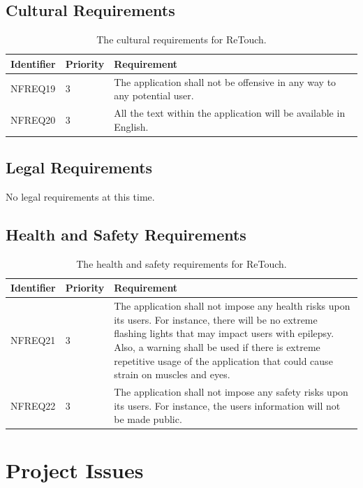 \documentclass[12pt, titlepage]{article}
\begin{document}
\subsection{Cultural Requirements}

\begin{table}[H]
  \caption{The cultural requirements for ReTouch.}
\begin{tabular}{ |m{2cm}|m{1.8cm}|m{9.4cm}| }
    \hline
    \textbf{Identifier} & \textbf{Priority} & \textbf{Requirement} \\ 
    \hline
    NFREQ19 & 3 & The application shall not be offensive in any way to any potential user.\\
    \hline
    NFREQ20 & 3 & All the text within the application will be available in English. \\
    \hline
\end{tabular}
\end{table}

\subsection{Legal Requirements}

No legal requirements at this time.

\subsection{Health and Safety Requirements}

\begin{table}[H]
  \caption{The health and safety requirements for ReTouch.}
\begin{tabular}{ |m{2cm}|m{1.8cm}|m{9.4cm}| }
    \hline
    \textbf{Identifier} & \textbf{Priority} & \textbf{Requirement} \\ 
    \hline
    NFREQ21 & 3 & The application shall not impose any health risks upon its users. For instance, there will be no extreme flashing lights that may impact users with epilepsy. Also, a warning shall be used if there is extreme repetitive usage of the application that could cause strain on muscles and eyes. \\
    \hline
    NFREQ22 & 3 & The application shall not impose any safety risks upon its users. For instance, the users information will not be made public. \\
    \hline
\end{tabular}
\end{table}

\section{Project Issues}
\end{document}
